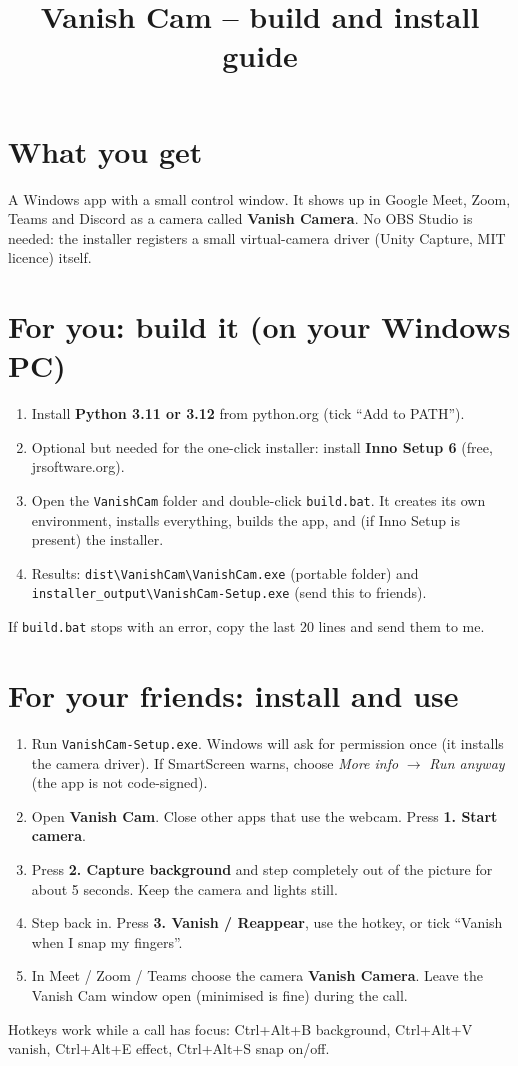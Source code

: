 \documentclass[11pt]{article}
\title{Vanish Cam -- build and install guide}
\author{}\date{}
\begin{document}
\maketitle

\section*{What you get}
A Windows app with a small control window. It shows up in Google Meet, Zoom, Teams and Discord as a camera called \textbf{Vanish Camera}. No OBS Studio is needed: the installer registers a small virtual-camera driver (Unity Capture, MIT licence) itself.

\section*{For you: build it (on your Windows PC)}
\begin{enumerate}
\item Install \textbf{Python 3.11 or 3.12} from python.org (tick ``Add to PATH'').
\item Optional but needed for the one-click installer: install \textbf{Inno Setup 6} (free, jrsoftware.org).
\item Open the \texttt{VanishCam} folder and double-click \texttt{build.bat}. It creates its own environment, installs everything, builds the app, and (if Inno Setup is present) the installer.
\item Results: \texttt{dist\textbackslash VanishCam\textbackslash VanishCam.exe} (portable folder) and \texttt{installer\_output\textbackslash VanishCam-Setup.exe} (send this to friends).
\end{enumerate}
If \texttt{build.bat} stops with an error, copy the last 20 lines and send them to me.

\section*{For your friends: install and use}
\begin{enumerate}
\item Run \texttt{VanishCam-Setup.exe}. Windows will ask for permission once (it installs the camera driver). If SmartScreen warns, choose \emph{More info} $\rightarrow$ \emph{Run anyway} (the app is not code-signed).
\item Open \textbf{Vanish Cam}. Close other apps that use the webcam. Press \textbf{1. Start camera}.
\item Press \textbf{2. Capture background} and step completely out of the picture for about 5 seconds. Keep the camera and lights still.
\item Step back in. Press \textbf{3. Vanish / Reappear}, use the hotkey, or tick ``Vanish when I snap my fingers''.
\item In Meet / Zoom / Teams choose the camera \textbf{Vanish Camera}. Leave the Vanish Cam window open (minimised is fine) during the call.
\end{enumerate}
Hotkeys work while a call has focus: Ctrl+Alt+B background, Ctrl+Alt+V vanish, Ctrl+Alt+E effect, Ctrl+Alt+S snap on/off.
\end{document}
